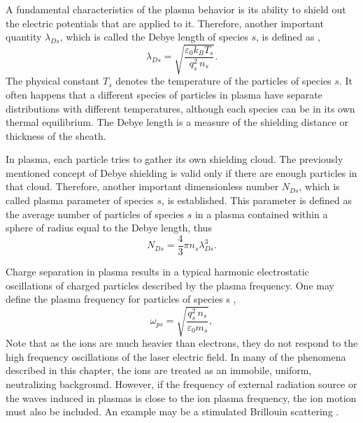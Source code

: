A fundamental characteristics of the plasma behavior is its ability to shield out the electric potentials that are applied to it. Therefore, another important quantity $ \lambda_{Ds} $, which is called the Debye length of species $ s $, is defined as \cite{Chen1984},
\begin{equation}
\label{2.1.3}
\lambda_{Ds} = \sqrt{\frac{\varepsilon_0 k_B T_s}{q_s^2 \, n_s}}.
\end{equation}
The physical constant $ T_s $ denotes the temperature of the particles of species $ s $. It often happens that a different species of particles in plasma have separate distributions with different temperatures, although each species can be in its own thermal equilibrium. The Debye length is a measure of the shielding distance or thickness of the sheath.

In plasma, each particle tries to gather its own shielding cloud. The previously mentioned concept of Debye shielding is valid only if there are enough particles in that cloud. Therefore, another important dimensionless number $ N_{Ds} $, which is called plasma parameter of species $ s $, is established. This parameter is defined as the average number of particles of species $ s $ in a plasma contained within a sphere of radius equal to the Debye length, thus \cite{Chen1984}
\begin{equation}
\label{2.1.4}
N_{Ds} = \frac{4}{3} \pi n_s \lambda_{Ds}^3. 
\end{equation}

Charge separation in plasma results in a typical harmonic electrostatic oscillations of charged particles described by the plasma frequency. One may define the plasma frequency for particles of species s \cite{Chen1984},
\begin{equation}
\label{2.1.5}
\omega_{ps} = \sqrt{\frac{q_s^{2}\,n_s}{\varepsilon_0 m_s}},
\end{equation}
Note that as the ions are much heavier than electrons, they do not respond to the high frequency oscillations of the laser electric field. In many of the phenomena described in this chapter, the ions are treated as an immobile, uniform, neutralizing background. However, if the frequency of external radiation source or the waves induced in plasmas is close to the ion plasma frequency, the ion motion must also be included. An example may be a stimulated Brillouin scattering \cite{kruer}.

